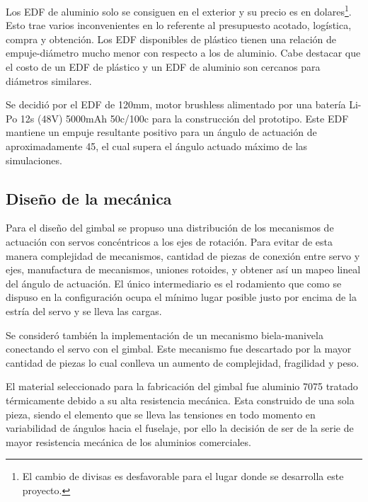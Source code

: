 \medskip

Los EDF de aluminio solo se consiguen en el exterior y su precio es en dolares\footnote{El cambio de divisas es desfavorable para el lugar donde se desarrolla este proyecto.}. Esto trae varios inconvenientes en lo referente al presupuesto acotado, logística, compra y obtención. Los EDF
disponibles de plástico tienen una relación de empuje-diámetro mucho menor con respecto a
los de aluminio. Cabe destacar que el costo de un EDF de plástico y un EDF de aluminio son cercanos para diámetros similares.

\medskip

Se decidió por el EDF de 120mm, motor brushless alimentado por una batería Li-Po 12s (48V) 5000mAh 50c/100c para la construcción del prototipo. Este EDF mantiene un empuje resultante positivo para un ángulo de actuación de aproximadamente 45\grad , el cual supera el ángulo actuado máximo de las simulaciones.







\subsection{Diseño de la mecánica}

Para el diseño del gimbal se propuso una distribución de los mecanismos de actuación con
servos concéntricos a los ejes de rotación. Para evitar de esta manera complejidad de
mecanismos, cantidad de piezas de conexión entre servo y ejes, manufactura de mecanismos,
uniones rotoides, y obtener así un mapeo lineal del ángulo de actuación. El único intermediario
es el rodamiento que como se dispuso en la configuración ocupa el mínimo lugar posible justo
por encima de la estría del servo y se lleva las cargas. 

Se consideró también la implementación de un mecanismo biela-manivela conectando el servo con el gimbal. Este mecanismo fue descartado por la mayor cantidad de piezas lo cual conlleva un aumento de complejidad, fragilidad y peso. 

\medskip

El material seleccionado para la fabricación del gimbal fue aluminio 7075 tratado térmicamente debido a su alta resistencia mecánica. Esta construido de una sola pieza, siendo el elemento que se lleva las tensiones
en todo momento en variabilidad de ángulos hacia el fuselaje, por ello la decisión de ser de la
serie de mayor resistencia mecánica de los aluminios comerciales.

